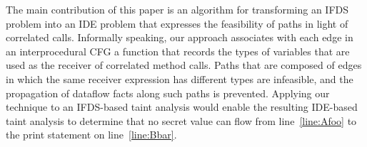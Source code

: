 The main contribution of this paper is an algorithm for transforming an IFDS problem 
into an IDE problem that expresses the feasibility of paths
in light of correlated calls.
Informally speaking, our approach associates with each edge in an
interprocedural CFG a function that records the types of 
variables that are used as the receiver of correlated method calls. Paths that 
are composed of edges in which the same receiver expression has different types
are infeasible, and the propagation of dataflow facts along such paths is
prevented. Applying our technique to an IFDS-based taint analysis would enable
the resulting IDE-based taint analysis to determine that no secret value can flow from
line~\ref{line:Afoo} to the print statement on line~\ref{line:Bbar}.

